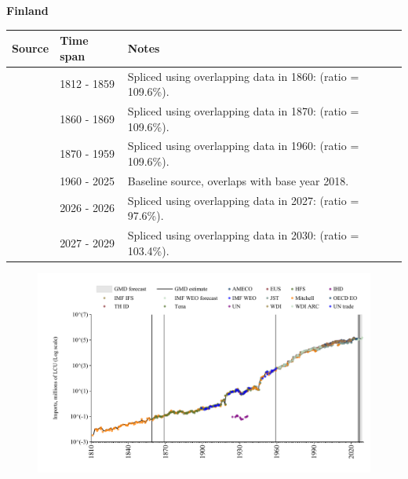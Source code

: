 \documentclass[12pt,a4paper,landscape]{article}
\begin{document}
\begin{adjustbox}{max totalsize={\paperwidth}{\paperheight},center}
\begin{minipage}[t][\textheight][t]{\textwidth}
\vspace*{0.5cm}
{}
\begin{center}
{\Large\bfseries Finland}
\end{center}
\vspace{0.5cm}
\begin{table}[H]
\centering
\small
\begin{tabular}{|l|l|l|}
\hline
\textbf{Source} & \textbf{Time span} & \textbf{Notes} \\
\hline
\rowcolor{white}\cite{Mitchell}& 1812 - 1859 &Spliced using overlapping data in 1860: (ratio = 109.6\%).\\
\rowcolor{lightgray}\cite{Tena}& 1860 - 1869 &Spliced using overlapping data in 1870: (ratio = 109.6\%).\\
\rowcolor{white}\cite{JST}& 1870 - 1959 &Spliced using overlapping data in 1960: (ratio = 109.6\%).\\
\rowcolor{lightgray}\cite{OECD_EO}& 1960 - 2025 &Baseline source, overlaps with base year 2018.\\
\rowcolor{white}\cite{AMECO}& 2026 - 2026 &Spliced using overlapping data in 2027: (ratio = 97.6\%).\\
\rowcolor{lightgray}\cite{IMF_WEO_forecast}& 2027 - 2029 &Spliced using overlapping data in 2030: (ratio = 103.4\%).\\
\hline
\end{tabular}
\end{table}
\begin{figure}[H]
\centering
\includegraphics[width=\textwidth,height=0.6\textheight,keepaspectratio]{graphs/FIN_imports.pdf}
\end{figure}
\end{minipage}
\end{adjustbox}
\end{document}
